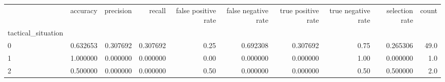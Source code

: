 \begin{tabular}{lrrrrrrrrr}
\toprule
{} &  accuracy &  precision &    recall &  false positive rate &  false negative rate &  true positive rate &  true negative rate &  selection rate &  count \\
tactical\_situation &           &            &           &                      &                      &                     &                     &                 &        \\
\midrule
0                  &  0.632653 &   0.307692 &  0.307692 &                 0.25 &             0.692308 &            0.307692 &                0.75 &        0.265306 &   49.0 \\
1                  &  1.000000 &   0.000000 &  0.000000 &                 0.00 &             0.000000 &            0.000000 &                1.00 &        0.000000 &    1.0 \\
2                  &  0.500000 &   0.000000 &  0.000000 &                 0.50 &             0.000000 &            0.000000 &                0.50 &        0.500000 &    2.0 \\
\bottomrule
\end{tabular}
